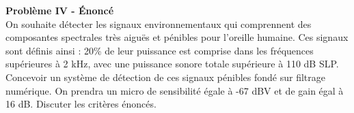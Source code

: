 
\textbf{Problème IV - Énoncé } \ \\
On souhaite détecter les signaux environnementaux qui comprennent des composantes spectrales très aiguës et pénibles pour l'oreille humaine. Ces signaux sont définis ainsi : 20\% de leur puissance est comprise dans les fréquences supérieures à 2 kHz, avec une puissance sonore totale supérieure à 110 dB SLP. \\
Concevoir un système de détection de ces signaux pénibles fondé sur filtrage
numérique. On prendra un micro de sensibilité égale à -67 dBV et de gain égal à 16 dB. Discuter les critères énoncés.

